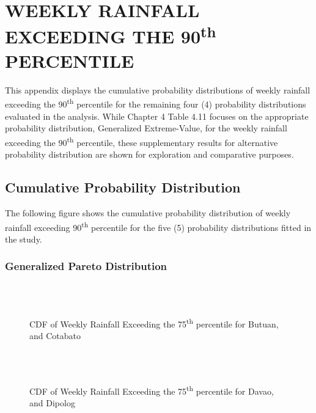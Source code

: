 \chapter{WEEKLY RAINFALL EXCEEDING THE 90\texorpdfstring{\textsuperscript{th}}{th} PERCENTILE}

This appendix displays the cumulative probability distributions of weekly rainfall exceeding the 90\textsuperscript{th} percentile for the remaining four (4) probability distributions evaluated in the analysis. While Chapter 4 Table 4.11 focuses on the appropriate probability distribution, Generalized Extreme-Value, for the weekly rainfall exceeding the 90\textsuperscript{th} percentile, these supplementary results for alternative probability distribution are shown for exploration and comparative purposes.

\section{Cumulative Probability Distribution}
The following figure shows the cumulative probability distribution of weekly rainfall exceeding 90\textsuperscript{th} percentile for the five (5) probability distributions fitted in the study.

\subsection{Generalized Pareto Distribution}

\begin{figure}[H]
  \centering
  \\
  \\
  \caption{CDF of Weekly Rainfall Exceeding the 75\textsuperscript{th} percentile for Butuan, and Cotabato}
  \label{fig:weekly_0.90_appendix_gpd_pt1}
\end{figure}

\begin{figure}[H]
  \centering
  \\
  \\
  \caption{CDF of Weekly Rainfall Exceeding the 75\textsuperscript{th} percentile for Davao, and Dipolog}
  \label{fig:weekly_0.90_appendix_gpd_pt2}
\end{figure}

